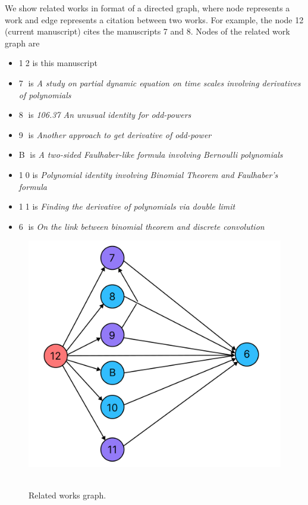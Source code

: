 We show related works in format of a directed graph, where node represents
a work and edge represents a citation between two works.
For example, the node 12 (current manuscript) cites the manuscripts 7 and 8.
Nodes of the related work graph are
\begin{itemize}
    \item {\Large \textcircled{\normalsize 12}} is this manuscript
    \item {\Large \textcircled{\normalsize 7}} is \textit{A study on partial dynamic equation on time scales involving derivatives
    of polynomials}~\cite{kolosov2016study}
    \item {\Large \textcircled{\normalsize 8}} is \textit{106.37 An unusual identity for odd-powers}~\cite{kolosov2022106}
    \item {\Large \textcircled{\normalsize 9}} is \textit{Another approach to get derivative of odd-power}~\cite{kolosov2023another}
    \item {\Large \textcircled{\normalsize B}} is \textit{A two-sided Faulhaber-like formula involving Bernoulli polynomials}~\cite{barbero2020two}
    \item {\Large \textcircled{\normalsize 10}} is \textit{Polynomial identity involving Binomial Theorem and Faulhaber's formula}~\cite{kolosov2023polynomial}
    \item {\Large \textcircled{\normalsize 11}} is \textit{Finding the derivative of polynomials via double limit}~\cite{kolosov_2024_10575485}
    \item {\Large \textcircled{\normalsize 6}} is \textit{On the link between binomial theorem and discrete convolution}~\cite{kolosov2016link}
\end{itemize}
\begin{figure}[H]
    \centering
    \includegraphics[width=1\textwidth]{images/realated_works_graph}
    ~\caption{Related works graph.}\label{fig:related-works-graph}
\end{figure}
